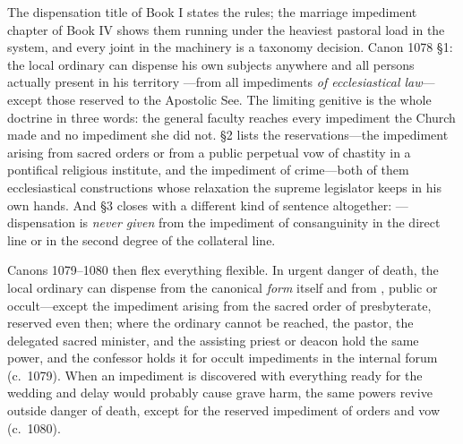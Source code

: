 The dispensation title of Book I states the rules; the marriage impediment chapter of Book IV shows them running under the heaviest pastoral load in the system, and every joint in the machinery is a taxonomy decision. Canon 1078 §1: the local ordinary can dispense his own subjects anywhere and all persons actually present in his territory ---from all impediments \emph{of ecclesiastical law}---except those reserved to the Apostolic See. The limiting genitive is the whole doctrine in three words: the general faculty reaches every impediment the Church made and no impediment she did not. §2 lists the reservations---the impediment arising from sacred orders or from a public perpetual vow of chastity in a pontifical religious institute, and the impediment of crime---both of them ecclesiastical constructions whose relaxation the supreme legislator keeps in his own hands. And §3 closes with a different kind of sentence altogether: ---dispensation is \emph{never given} from the impediment of consanguinity in the direct line or in the second degree of the collateral line.

Canons 1079--1080 then flex everything flexible. In urgent danger of death, the local ordinary can dispense from the canonical \emph{form} itself and from , public or occult---except the impediment arising from the sacred order of presbyterate, reserved even then; where the ordinary cannot be reached, the pastor, the delegated sacred minister, and the assisting priest or deacon hold the same power, and the confessor holds it for occult impediments in the internal forum (c.~1079). When an impediment is discovered with everything ready for the wedding and delay would probably cause grave harm, the same powers revive outside danger of death, except for the reserved impediment of orders and vow (c.~1080).

